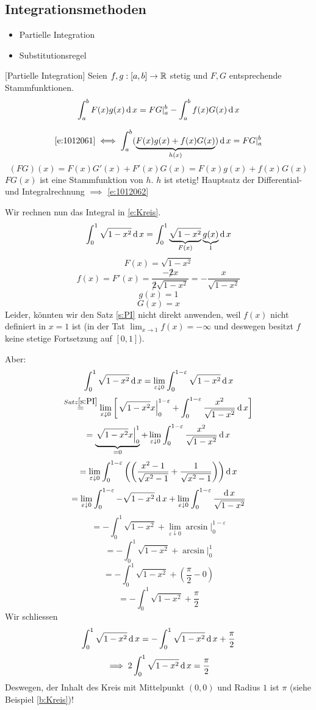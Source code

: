\subsection{Integrationsmethoden}
\begin{itemize}
  \item Partielle Integration
  \item Substitutionsregel
\end{itemize}
\begin{Sat}\label{s:PI}[Partielle Integration]
  Seien $f,g:[a,b]\to\mathbb{R}$ stetig und $F,G$ entsprechende Stammfunktionen.
  \begin{equation}\label{e:1012061}
    \int_a^bF(x)g(x)\operatorname{d} x=FG|_a^b-\int_a^bf(x)G(x)\operatorname{d} x
  \end{equation}
\end{Sat}
\begin{Bew}
  \begin{equation}\label{e:1012062}
    \eqref{e:1012061}\iff\int_a^b(\underbrace{F(x)g(x)+f(x)G(x)}_{h(x)})\operatorname{d} x = FG|_a^b
  \end{equation}
  \[(FG)(x)=F(x)G'(x)+F'(x)G(x)=F(x)g(x) + f(x)G(x)\]
  $FG(x)$ ist eine Stammfunktion von $h$. $h$ ist stetig!
  Hauptsatz der Differential- und Integralrechnung $\implies$ \eqref{e:1012062}
\end{Bew}
\begin{Bsp} Wir rechnen nun das Integral in \eqref{e:Kreis}.
  \[\int_0^1\sqrt{1-x^2}\operatorname{d} x=\int_0^1\underbrace{\sqrt{1-x^2}}_{F(x)}\underbrace{g(x)}_1\operatorname{d} x\]
  \[F(x)=\sqrt{1-x^2}\]
  \[f(x)=F'(x)=\frac{-\not 2 x}{\not 2\sqrt{1-x^2}}=-\frac{x}{\sqrt{1-x^2}}\]
  \[g(x)=1\]
  \[G(x)=x\]
Leider, k\"onnten wir den Satz \ref{s:PI} nicht direkt anwenden, weil
$f(x)$ nicht definiert in $x=1$ ist (in der Tat $\lim_{x\to 1} f(x) = -\infty$ und
deswegen besitzt $f$ keine stetige Fortsetzung auf $[0,1]$).

Aber:
  \[\int_0^1 \sqrt{1-x^2} \operatorname{d} x = \lim_{\varepsilon\downarrow 0}\int_0^{1-\varepsilon}\sqrt{1-x^2}\operatorname{d} x\]
  \[\stackrel{Satz \ref{s:PI}}{=} \lim_{\varepsilon\downarrow 0}\left[ \left.\sqrt{1-x^2}x\right|_0^{1-\varepsilon}+\int_0^{1-\varepsilon}\frac{x^2}{\sqrt{1-x^2}}\operatorname{d} x \right]\]
  \[=\underbrace{\left.\sqrt{1-x^2}x\right|_0^1}_{=0} + \lim_{\varepsilon\downarrow 0}\int_0^{1-\varepsilon}\frac{x^2}{\sqrt{1-x^2}}\operatorname{d} x\]
  \[= \lim_{\varepsilon\downarrow 0}\int_0^{1-\varepsilon}\left( \left( \frac{x^2-1}{\sqrt{x^2-1}}+\frac{1}{\sqrt{x^2-1}} \right) \right)\operatorname{d} x\]
  \[= \lim_{\varepsilon\downarrow 0}\int_0^{1-\varepsilon}-\sqrt{1-x^2}\operatorname{d} x+\lim_{\varepsilon\downarrow 0}\int_0^{1-\varepsilon}\frac{\operatorname{d} x}{\sqrt{1-x^2}}\]
  \[=-\int_0^1\sqrt{1-x^2}+\lim_{\varepsilon\downarrow 0}\arcsin\Big|_0^{1-\varepsilon}\]
  \[=-\int_0^1\sqrt{1-x^2}+ \arcsin\Big|_0^{1}\]
  \[=-\int_0^1\sqrt{1-x^2}+\left( \frac{\pi}{2}-0 \right)\]
  \[=-\int_0^1\sqrt{1-x^2}+\frac{\pi}{2}\]
Wir schliessen
\[\int_0^1\sqrt{1-x^2}\operatorname{d} x=-\int_0^1\sqrt{1-x^2}\operatorname{d} x+\frac{\pi}{2}\]
\[\implies  2\int_0^1\sqrt{1-x^2}\operatorname{d} x=\frac{\pi}{2}\]
Deswegen, der Inhalt des Kreis mit Mittelpunkt $(0,0)$ und Radius $1$ ist $\pi$
(siehe Beispiel \ref{b:Kreis})!
\end{Bsp}
